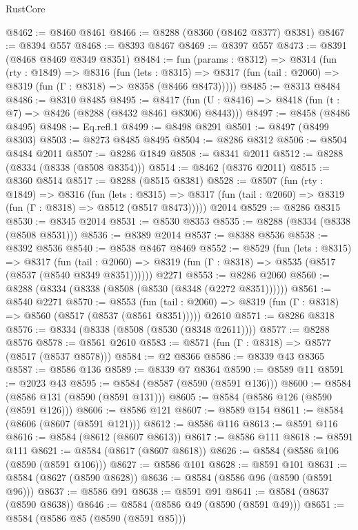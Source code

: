 \begin{lexlean}{RustCore}
\begin{coremodule}
@8462 := @8460 @8461
@8466 := @8288 (@8360 (@8462 @8377) @8381)
@8467 := @8394 @557
@8468 := @8393 @8467
@8469 := @8397 @557
@8473 := @8391 (@8468 @8469 @8349 @8351)
@8484 := fun (params : @8312) =>
  @8314
    (fun (rty : @1849) =>
    @8316
      (fun (lets : @8315) =>
      @8317 (fun (tail : @2060) => @8319 (fun (Γ : @8318) => @8358 (@8466 @8473)))))
@8485 := @8313 @8484
@8486 := @8310 @8485
@8495 := @8417 (fun (U : @8416) => @8418 (fun (t : @7) => @8426 (@8288 (@8432 @8461 @8306) @8443)))
@8497 := @8458 (@8486 @8495)
@8498 := Eq.refl.{1}
@8499 := @8498 @8291
@8501 := @8497 (@8499 @8303)
@8503 := @8273 @8485 @8495
@8504 := @8286 @8312
@8506 := @8504 @8484 @2011
@8507 := @8286 @1849
@8508 := @8341 @2011
@8512 := @8288 (@8334 (@8338 (@8508 @8354)))
@8514 := @8462 (@8376 @2011)
@8515 := @8360 @8514
@8517 := @8288 (@8515 @8381)
@8528 := @8507
    (fun (rty : @1849) =>
    @8316
      (fun (lets : @8315) =>
      @8317 (fun (tail : @2060) => @8319 (fun (Γ : @8318) => @8512 (@8517 @8473)))))
    @2014
@8529 := @8286 @8315
@8530 := @8345 @2014
@8531 := @8530 @8353
@8535 := @8288 (@8334 (@8338 (@8508 @8531)))
@8536 := @8389 @2014
@8537 := @8388 @8536
@8538 := @8392 @8536
@8540 := @8538 @8467 @8469
@8552 := @8529
    (fun (lets : @8315) =>
    @8317
      (fun (tail : @2060) => @8319 (fun (Γ : @8318) => @8535 (@8517 (@8537 (@8540 @8349 @8351))))))
    @2271
@8553 := @8286 @2060
@8560 := @8288 (@8334 (@8338 (@8508 (@8530 (@8348 (@2272 @8351))))))
@8561 := @8540 @2271
@8570 := @8553
    (fun (tail : @2060) => @8319 (fun (Γ : @8318) => @8560 (@8517 (@8537 (@8561 @8351)))))
    @2610
@8571 := @8286 @8318
@8576 := @8334 (@8338 (@8508 (@8530 (@8348 @2611))))
@8577 := @8288 @8576
@8578 := @8561 @2610
@8583 := @8571 (fun (Γ : @8318) => @8577 (@8517 (@8537 @8578)))
@8584 := @2 @8366
@8586 := @8339 @43 @8365
@8587 := @8586 @136
@8589 := @8339 @7 @8364
@8590 := @8589 @11
@8591 := @2023 @43
@8595 := @8584 (@8587 (@8590 (@8591 @136)))
@8600 := @8584 (@8586 @131 (@8590 (@8591 @131)))
@8605 := @8584 (@8586 @126 (@8590 (@8591 @126)))
@8606 := @8586 @121
@8607 := @8589 @154
@8611 := @8584 (@8606 (@8607 (@8591 @121)))
@8612 := @8586 @116
@8613 := @8591 @116
@8616 := @8584 (@8612 (@8607 @8613))
@8617 := @8586 @111
@8618 := @8591 @111
@8621 := @8584 (@8617 (@8607 @8618))
@8626 := @8584 (@8586 @106 (@8590 (@8591 @106)))
@8627 := @8586 @101
@8628 := @8591 @101
@8631 := @8584 (@8627 (@8590 @8628))
@8636 := @8584 (@8586 @96 (@8590 (@8591 @96)))
@8637 := @8586 @91
@8638 := @8591 @91
@8641 := @8584 (@8637 (@8590 @8638))
@8646 := @8584 (@8586 @49 (@8590 (@8591 @49)))
@8651 := @8584 (@8586 @85 (@8590 (@8591 @85)))

\end{coremodule}
\end{lexlean}
